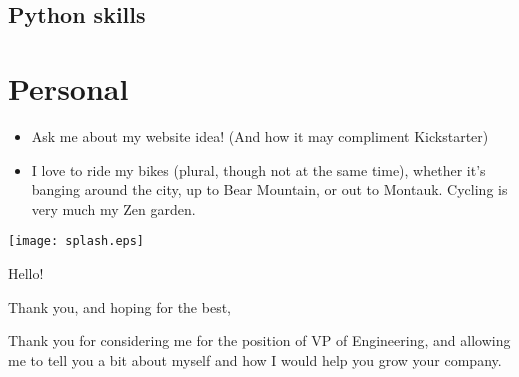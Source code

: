 \documentclass[11pt,letterpaper,roman]{moderncv}
\begin{document}
\subsection{Python skills}
\begin{cvcolumns}
\end{cvcolumns}


\section{Personal}
\begin{itemize}
    \item Ask me about my website idea!  (And how it may compliment Kickstarter)
    \item I love to ride my bikes (plural, though not at the same time), whether it's banging around the city, up to Bear Mountain, or out to Montauk.  Cycling is very much my Zen garden.
\end{itemize}
\centerline{\texttt{[image: splash.eps]}}


\clearpage
{}
\date{August 10, 2014}
\opening{Hello!}

\closing{Thank you, and hoping for the best,}
\makelettertitle
Thank you for considering me for the position of VP of Engineering, and allowing me to tell you a bit about myself and how I would help you grow your company.

\makeletterclosing
\end{document}
